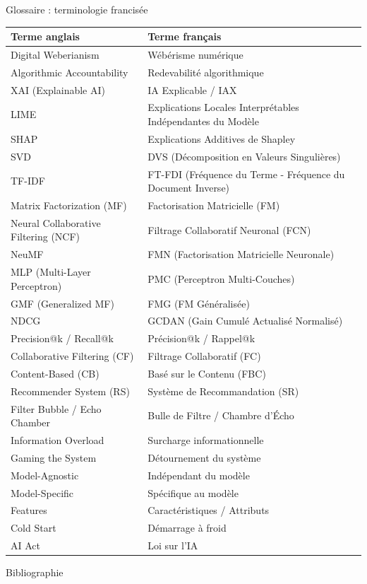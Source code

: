\documentclass[9pt, aspectratio=169]{beamer}
\begin{document}
\begin{frame}{Glossaire : terminologie francisée}
    \footnotesize
    \begin{table}[]
        \centering
        \begin{tabular}{@{}p{5cm}p{6cm}@{}}
            \toprule
            \textbf{Terme anglais} & \textbf{Terme français} \\ \midrule
            Digital Weberianism & Wébérisme numérique \\
            Algorithmic Accountability & Redevabilité algorithmique \\
            XAI (Explainable AI) & IA Explicable / IAX \\
            LIME & Explications Locales Interprétables Indépendantes du Modèle \\
            SHAP & Explications Additives de Shapley \\
            SVD & DVS (Décomposition en Valeurs Singulières) \\
            TF-IDF & FT-FDI (Fréquence du Terme - Fréquence du Document Inverse) \\
            Matrix Factorization (MF) & Factorisation Matricielle (FM) \\
            Neural Collaborative Filtering (NCF) & Filtrage Collaboratif Neuronal (FCN) \\
            NeuMF & FMN (Factorisation Matricielle Neuronale) \\
            MLP (Multi-Layer Perceptron) & PMC (Perceptron Multi-Couches) \\
            GMF (Generalized MF) & FMG (FM Généralisée) \\
            NDCG & GCDAN (Gain Cumulé Actualisé Normalisé) \\
            Precision@k / Recall@k & Précision@k / Rappel@k \\
            Collaborative Filtering (CF) & Filtrage Collaboratif (FC) \\
            Content-Based (CB) & Basé sur le Contenu (FBC) \\
            Recommender System (RS) & Système de Recommandation (SR) \\
            Filter Bubble / Echo Chamber & Bulle de Filtre / Chambre d'Écho \\
            Information Overload & Surcharge informationnelle \\
            Gaming the System & Détournement du système \\
            Model-Agnostic & Indépendant du modèle \\
            Model-Specific & Spécifique au modèle \\
            Features & Caractéristiques / Attributs \\
            Cold Start & Démarrage à froid \\
            AI Act & Loi sur l'IA \\ \bottomrule
        \end{tabular}
    \end{table}
\end{frame}

\begin{frame}[allowframebreaks]{Bibliographie}
    \printbibliography
\end{frame}
\end{document}
